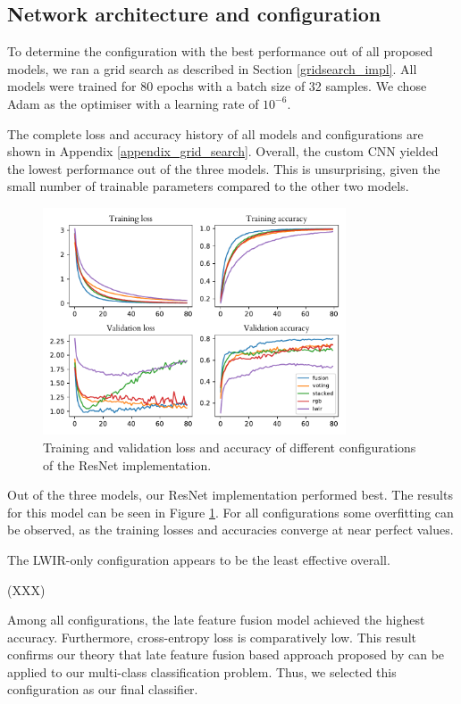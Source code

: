 \documentclass{l4proj}
\begin{document}
\subsection{Network architecture and configuration}

To determine the configuration with the best performance out of all proposed models, we ran a grid search as described in Section \ref{gridsearch_impl}. All models were trained for 80 epochs with a batch size of 32 samples. We chose Adam as the optimiser with a learning rate of $10^{-6}$. 

The complete loss and accuracy history of all models and configurations are shown in Appendix \ref{appendix_grid_search}. Overall, the custom CNN yielded the lowest performance out of the three models. This is unsurprising, given the small number of trainable parameters compared to the other two models.

\begin{figure}[ht]
  \centering
  \includegraphics[width=0.8\textwidth]{images/evaluation/gridsearch/ResNet}
  \caption{Training and validation loss and accuracy of different configurations of the ResNet implementation.}
  \label{fig:resnet_configs}
\end{figure}

Out of the three models, our ResNet implementation performed best. The results for this model can be seen in Figure \ref{fig:resnet_configs}. For all configurations some overfitting can be observed, as the training losses and accuracies converge at near perfect values.

The LWIR-only configuration appears to be the least effective overall. 

(XXX)

Among all configurations, the late feature fusion model achieved the highest accuracy. Furthermore, cross-entropy loss is comparatively low. This result confirms our theory that late feature fusion based approach proposed by \citet{wagner_multispectral_2016} can be applied to our multi-class classification problem. Thus, we selected this configuration as our final classifier. 
\end{document}
